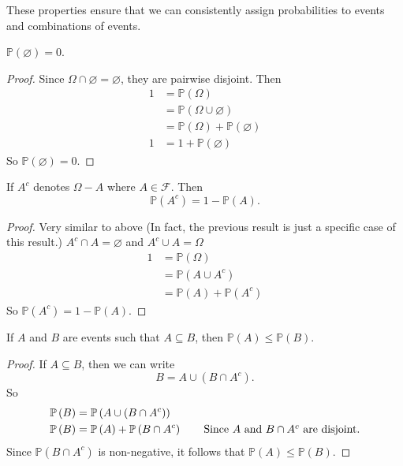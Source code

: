 These properties ensure that we can consistently assign probabilities to events and combinations of events.

\begin{lemma}
    \( \mathbb{P} \left( \varnothing \right)=0 \).
\end{lemma}
\begin{proof}
    Since \( \Omega \cap \varnothing = \varnothing \), they are pairwise disjoint. Then
    \begin{align*}
        1 &= \mathbb{P} \left( \Omega \right)\\ 
        &= \mathbb{P} \left( \Omega \cup \varnothing \right) \\
        &= \mathbb{P} \left( \Omega \right) + \mathbb{P} \left( \varnothing \right) \\
       1 &= 1 + \mathbb{P} \left( \varnothing \right)
    \end{align*}
    So  \( \mathbb{P} \left( \varnothing \right)=0 \).
\end{proof}

\begin{lemma}
    If \( A^{c} \) denotes \( \Omega - A \) where \( A \in \mathscr{F} \). Then 
    \[ \mathbb{P} \left( A^{c} \right) = 1- \mathbb{P} \left( A \right) .\]
\end{lemma}
\begin{proof}
    Very similar to above (In fact, the previous result is just a specific case of this result.) \( A^{c} \cap A = \varnothing \) and \( A^{c} \cup A = \Omega \) 
    \begin{align*}
        1 &= \mathbb{P} \left( \Omega \right)\\ 
        &= \mathbb{P} \left( A \cup A^{c} \right) \\
        &= \mathbb{P} \left( A \right) + \mathbb{P} \left( A^{c} \right)
    \end{align*}
    So \( \mathbb{P} \left( A^{c} \right) = 1- \mathbb{P} \left( A \right) \).
\end{proof}

\begin{lemma}\label{thm:inequality-for-subsets-of-prob-space}
    If \( A \) and \( B \) are events such that \( A \subseteq B \), then \( \mathbb{P} \left( A \right) \le \mathbb{P} \left( B \right)\).
\end{lemma}
\begin{proof}
    If \( A \subseteq B \), then we can write 
    \[ B = A \cup \left( B \cap A^{c} \right) .\] So 
    \begin{align*}
        \mathbb{P} \left( B \right) &=  \mathbb{P} \left( A \cup \left( B \cap A^{c} \right)  \right) \\
        \mathbb{P} \left( B \right)&= \mathbb{P} \left( A \right) + \mathbb{P} \left( B \cap A^{c} \right) \tag*{Since $A$ and $B \cap A^{c}$ are disjoint.}
    \end{align*}
    Since \( \mathbb{P} \left( B \cap A^{c} \right) \) is non-negative, it follows that \( \mathbb{P} \left( A \right) \le \mathbb{P} \left( B \right)\).
\end{proof}

